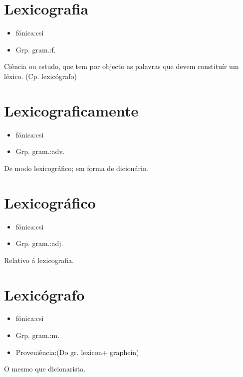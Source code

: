 \section{Lexicografia}
\begin{itemize}
\item {fónica:csi}
\end{itemize}
\begin{itemize}
\item {Grp. gram.:f.}
\end{itemize}
Ciência ou estudo, que tem por objecto as palavras que devem constituír um léxico.
(Cp. \textunderscore lexicógrafo\textunderscore )
\section{Lexicograficamente}
\begin{itemize}
\item {fónica:csi}
\end{itemize}
\begin{itemize}
\item {Grp. gram.:adv.}
\end{itemize}
De modo lexicográfico; em forma de dicionário.
\section{Lexicográfico}
\begin{itemize}
\item {fónica:csi}
\end{itemize}
\begin{itemize}
\item {Grp. gram.:adj.}
\end{itemize}
Relativo á lexicografia.
\section{Lexicógrafo}
\begin{itemize}
\item {fónica:csi}
\end{itemize}
\begin{itemize}
\item {Grp. gram.:m.}
\end{itemize}
\begin{itemize}
\item {Proveniência:(Do gr. \textunderscore lexicon\textunderscore  + \textunderscore graphein\textunderscore )}
\end{itemize}
O mesmo que \textunderscore dicionarista\textunderscore .
